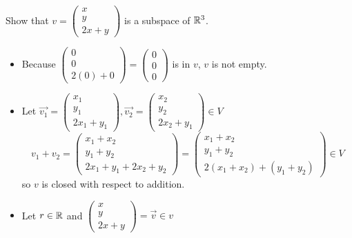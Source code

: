   \begin{problem}
    Show that $v=\left(\begin{smallmatrix}x\\y\\2x+y\end{smallmatrix}\right)$ is a subspace of $\mathbb{R}^3$.

    \begin{itemize}
      \item Because $\left(\begin{smallmatrix}0\\0\\2(0)+0\end{smallmatrix}\right)=\left(\begin{smallmatrix}0\\0\\0\end{smallmatrix}\right)$ is in $v$, $v$ is not empty.
      \item Let $\vec{v_1}=\left(\begin{smallmatrix}x_1\\y_1\\2x_1+y_1\end{smallmatrix}\right),\vec{v_2}=\left(\begin{smallmatrix}x_2\\y_2\\2x_2+y_1\end{smallmatrix}\right)\in V$
        \begin{equation}
          v_1+v_2=\begin{pmatrix}
            x_1+x_2\\
            y_1+y_2\\
            2x_1+y_1+2x_2+y_2
          \end{pmatrix}
          = \begin{pmatrix}
            x_1+x_2\\
            y_1+y_2\\
            2(x_1+x_2)+(y_1+y_2)
          \end{pmatrix}
          \in V
        \end{equation}
        so $v$ is closed with respect to addition.
      \item Let $r\in\mathbb{R}$ and $\left(\begin{smallmatrix}x\\y\\2x+y\end{smallmatrix}\right)=\vec{v}\in v$
    \end{itemize}
  \end{problem}


